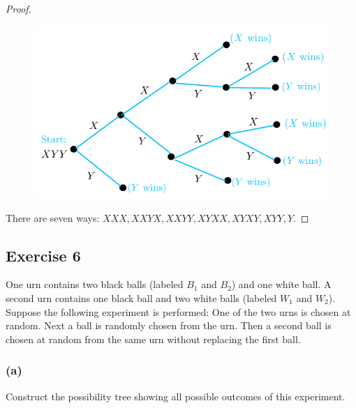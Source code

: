 \documentclass[14pt]{extarticle}
\begin{document}
\begin{proof}
\begin{figure}[ht!]
\centering
\includegraphics[scale=0.31]{../images/9.2.5.png}
\end{figure}

There are seven ways: \(XXX, XXYX, XXYY, XYXX, XYXY, XYY, Y\).
\end{proof}

\subsection{Exercise 6}
One urn contains two black balls (labeled \(B_1\) and \(B_2\)) and one white ball. A second urn contains one black 
ball and two white balls (labeled \(W_1\) and \(W_2\)). Suppose the following experiment is performed: One of the 
two urns is chosen at random. Next a ball is randomly chosen from the urn. Then a second ball is chosen at random 
from the same urn without replacing the first ball.

\subsubsection{(a)}
Construct the possibility tree showing all possible outcomes of this experiment.
\end{document}
